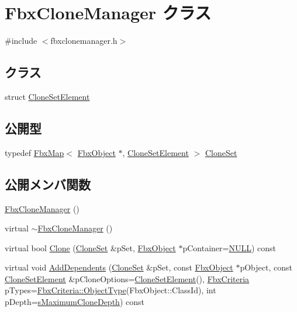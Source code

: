 \hypertarget{class_fbx_clone_manager}{}\section{Fbx\+Clone\+Manager クラス}
\label{class_fbx_clone_manager}


{\ttfamily \#include $<$fbxclonemanager.\+h$>$}

\subsection*{クラス}
\begin{DoxyCompactItemize}
\item 
struct \hyperlink{struct_fbx_clone_manager_1_1_clone_set_element}{Clone\+Set\+Element}
\end{DoxyCompactItemize}
\subsection*{公開型}
\begin{DoxyCompactItemize}
\item 
typedef \hyperlink{class_fbx_map}{Fbx\+Map}$<$ \hyperlink{class_fbx_object}{Fbx\+Object} $\ast$, \hyperlink{struct_fbx_clone_manager_1_1_clone_set_element}{Clone\+Set\+Element} $>$ \hyperlink{class_fbx_clone_manager_aeb8a9c04c9c36eb7e551186a0b18f10d}{Clone\+Set}
\end{DoxyCompactItemize}
\subsection*{公開メンバ関数}
\begin{DoxyCompactItemize}
\item 
\hyperlink{class_fbx_clone_manager_a107bf53621e736a37d7a6ead38a4d899}{Fbx\+Clone\+Manager} ()
\item 
virtual \hyperlink{class_fbx_clone_manager_a8e2ff57b1e9d8ed1b8edb4274cf1c369}{$\sim$\+Fbx\+Clone\+Manager} ()
\item 
virtual bool \hyperlink{class_fbx_clone_manager_a2a7f5f060bf0cf0737d0385542e1bc97}{Clone} (\hyperlink{class_fbx_clone_manager_aeb8a9c04c9c36eb7e551186a0b18f10d}{Clone\+Set} \&p\+Set, \hyperlink{class_fbx_object}{Fbx\+Object} $\ast$p\+Container=\hyperlink{fbxarch_8h_a070d2ce7b6bb7e5c05602aa8c308d0c4}{N\+U\+LL}) const
\item 
virtual void \hyperlink{class_fbx_clone_manager_a3a7786f536d8f61f0b84f114e6e870d2}{Add\+Dependents} (\hyperlink{class_fbx_clone_manager_aeb8a9c04c9c36eb7e551186a0b18f10d}{Clone\+Set} \&p\+Set, const \hyperlink{class_fbx_object}{Fbx\+Object} $\ast$p\+Object, const \hyperlink{struct_fbx_clone_manager_1_1_clone_set_element}{Clone\+Set\+Element} \&p\+Clone\+Options=\hyperlink{struct_fbx_clone_manager_1_1_clone_set_element}{Clone\+Set\+Element}(), \hyperlink{class_fbx_criteria}{Fbx\+Criteria} p\+Types=\hyperlink{class_fbx_criteria_a760d66022a8febcd3fd0c5fbbb534023}{Fbx\+Criteria\+::\+Object\+Type}(Fbx\+Object\+::\+Class\+Id), int p\+Depth=\hyperlink{class_fbx_clone_manager_a1844e81f1b96760b4223024b4c133da7}{s\+Maximum\+Clone\+Depth}) const
\end{DoxyCompactItemize}
